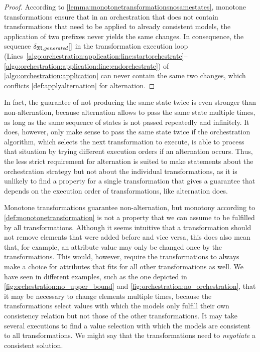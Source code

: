 \begin{proof}
    According to \autoref{lemma:monotonetransformationsnosamestates}, monotone transformations ensure that in an orchestration that does not contain transformations that need to be applied to already consistent models, the application of two prefixes never yields the same changes.
    In consequence, the sequence $\applyalggenerated$ in the transformation execution loop (Lines~\ref{algo:orchestration:application:line:startorchestrate}--\ref{algo:orchestration:application:line:endorchestrate}) of \autoref{algo:orchestration:application} can never contain the same two changes, which conflicts \autoref{def:applyalternation} for alternation.
\end{proof}

In fact, the guarantee of not producing the same state twice is even stronger than non-alternation, because alternation allows to pass the same state multiple times, as long as the same sequence of states is not passed repeatedly and infinitely.
It does, however, only make sense to pass the same state twice if the orchestration algorithm, which selects the next transformation to execute, is able to process that situation by trying different execution orders if an alternation occurs.
Thus, the less strict requirement for alternation is suited to make statements about the orchestration strategy but not about the individual transformations, as it is unlikely to find a property for a single transformation that gives a guarantee that depends on the execution order of transformations, like alternation does.

Monotone transformations guarantee non-alternation, but monotony according to \autoref{def:monotonetransformation} is not a property that we can assume to be fulfilled by all transformations.
Although it seems intuitive that a transformation should not remove elements that were added before and vice versa, this does also mean that, for example, an attribute value may only be changed once by the transformations.
This would, however, require the transformations to always make a choice for attributes that fits for all other transformations as well.
We have seen in different examples, such as the one depicted in \autoref{fig:orchestration:no_upper_bound} and \autoref{fig:orchestration:no_orchestration}, that it may be necessary to change elements multiple times, because the transformations select values with which the models only fulfill their own consistency relation but not those of the other transformations.
It may take several executions to find a value selection with which the models are consistent to all transformations.
We might say that the transformations need to \emph{negotiate} a consistent solution.

